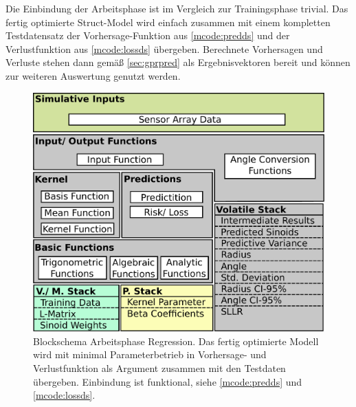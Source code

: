 Die Einbindung der Arbeitsphase ist im Vergleich zur Trainingsphase trivial. Das fertig optimierte Struct-Model wird einfach zusammen mit einem kompletten Testdatensatz der Vorhersage-Funktion aus \autoref{mcode:predds} und der Verlustfunktion aus \autoref{mcode:lossds} übergeben. Berechnete Vorhersagen und Verluste stehen dann gemäß \autoref{sec:gprpred} als Ergebnisvektoren bereit und können zur weiteren Auswertung genutzt werden.


\vspace{5mm}
\begin{figure}[tbph]
	\centering
	\includegraphics[width=0.7\linewidth]{chapters/images/3-SW-E-OExp/Blockschema_Workphase}
	\caption[Blockschema Arbeitsphase Regression]{Blockschema Arbeitsphase Regression. Das fertig optimierte Modell wird mit minimal Parameterbetrieb in Vorhersage- und Verlustfunktion als Argument zusammen mit den Testdaten übergeben. Einbindung ist funktional, siehe \autoref{mcode:predds} und \autoref{mcode:lossds}.}
	\label{fig:blockschemaworkphase}
\end{figure}


